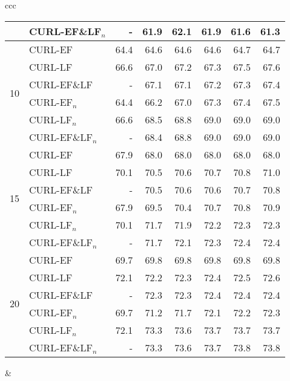 \documentclass[journal,11pt]{IEEEtran}
\begin{document}
\begin{table*}[!ht]
\begin{center}
{\begin{tabular}{ccc}
\begin{tabular}{|r|l|rrrrrr|}
& CURL-EF\&LF$_n$ & - & 61.9 & 62.1 & 61.9 & 61.6 & 61.3 \\
\hline
\multirow{6}{*}{10}
& CURL-EF & 64.4 & 64.6 & 64.6 & 64.6 & 64.7 & 64.7 \\
& CURL-LF & 66.6 & 67.0 & 67.2 & 67.3 & 67.5 & 67.6 \\
& CURL-EF\&LF & - & 67.1 & 67.1 & 67.2 & 67.3 & 67.4 \\
& CURL-EF$_n$ & 64.4 & 66.2 & 67.0 & 67.3 & 67.4 & 67.5 \\
& CURL-LF$_n$ & 66.6 & 68.5 & 68.8 & 69.0 & 69.0 & 69.0 \\
& CURL-EF\&LF$_n$ & - & 68.4 & 68.8 & 69.0 & 69.0 & 69.0 \\
\hline
\multirow{6}{*}{15}
& CURL-EF & 67.9 & 68.0 & 68.0 & 68.0 & 68.0 & 68.0 \\
& CURL-LF & 70.1 & 70.5 & 70.6 & 70.7 & 70.8 & 71.0 \\
& CURL-EF\&LF & - & 70.5 & 70.6 & 70.6 & 70.7 & 70.8 \\
& CURL-EF$_n$ & 67.9 & 69.5 & 70.4 & 70.7 & 70.8 & 70.9 \\
& CURL-LF$_n$ & 70.1 & 71.7 & 71.9 & 72.2 & 72.3 & 72.3 \\
& CURL-EF\&LF$_n$ & - & 71.7 & 72.1 & 72.3 & 72.4 & 72.4 \\
\hline
\multirow{6}{*}{20}
& CURL-EF & 69.7 & 69.8 & 69.8 & 69.8 & 69.8 & 69.8 \\
& CURL-LF & 72.1 & 72.2 & 72.3 & 72.4 & 72.5 & 72.6 \\
& CURL-EF\&LF & - & 72.3 & 72.3 & 72.4 & 72.4 & 72.4 \\
& CURL-EF$_n$ & 69.7 & 71.2 & 71.7 & 72.1 & 72.2 & 72.3 \\
& CURL-LF$_n$ & 72.1 & 73.3 & 73.6 & 73.7 & 73.7 & 73.7 \\
& CURL-EF\&LF$_n$ & - & 73.3 & 73.6 & 73.7 & 73.8 & 73.8 \\
\hline
\end{tabular}

&


\end{tabular}}
\end{center}
\end{table*}
\end{document}
